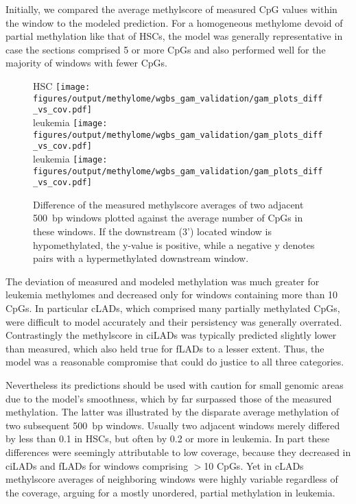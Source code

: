 Initially, we compared the average methylscore of measured CpG values within the window to the modeled prediction. For a homogeneous methylome devoid of partial methylation like that of \dnmtwt HSCs, the model was generally representative in case the sections comprised \num{5} or more CpGs and also performed well for the majority of windows with fewer CpGs. 

\begin{figure}[!ht]
	\centering \dnmtwt HSC
	\texttt{[image: figures/output/methylome/wgbs\_gam\_validation/gam\_plots\_diff\_vs\_cov.pdf]} 
	\vspace{0.1em} \\ \dnmtwt \kitpos leukemia	\texttt{[image: figures/output/methylome/wgbs\_gam\_validation/gam\_plots\_diff\_vs\_cov.pdf]}
	\vspace{0.1em} \\ \dnmtchip \kitpos leukemia \texttt{[image: figures/output/methylome/wgbs\_gam\_validation/gam\_plots\_diff\_vs\_cov.pdf]}
	\caption{Difference of the measured methylscore averages of two adjacent \SI{500}{bp} windows plotted against the average number of CpGs in these windows. If the downstream (3') located window is hypomethylated, the y-value is positive, while a negative y denotes pairs with a hypermethylated downstream window.}
	\label{fig:wgbs_gam_validation2}
\end{figure}\clearpage

The deviation of measured and modeled methylation was much greater for leukemia methylomes and decreased only for windows containing more than \num{10} CpGs. In particular cLADs, which comprised many partially methylated CpGs, were difficult to model accurately and their persistency was generally overrated. Contrastingly the methylscore in ciLADs was typically predicted slightly lower than measured, which also held true for fLADs to a lesser extent. Thus, the model was a reasonable compromise that could do justice to all three categories.

Nevertheless its predictions should be used with caution for small genomic areas due to the model's smoothness, which by far surpassed those of the measured methylation. The latter was illustrated by the disparate average methylation of two subsequent \SI{500}{bp} windows. Usually two adjacent windows merely differed by less than \num{0.1} in HSCs, but often by \num{0.2} or more in leukemia. In part these differences were seemingly attributable to low coverage, because they decreased in ciLADs and fLADs for windows comprising $>$\num{10} CpGs. Yet in cLADs methylscore averages of neighboring windows were highly variable regardless of the coverage, arguing for a mostly unordered, partial methylation in leukemia. 

